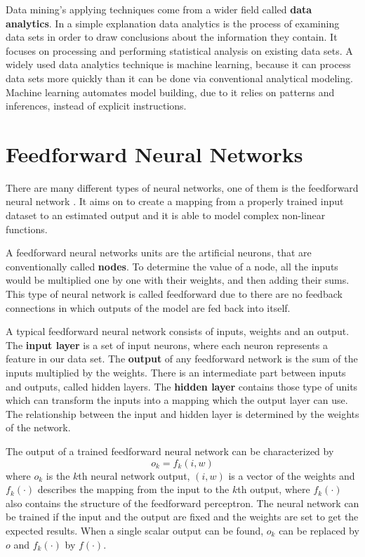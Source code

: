 Data mining's applying techniques come from a wider field called \textbf{data analytics}. In a simple explanation data analytics is the process of examining data sets in order to draw conclusions about the information they contain. It focuses on processing and performing statistical analysis on existing data sets. A widely used data analytics technique is machine learning, because it can process data sets more quickly than it can be done via conventional analytical modeling. Machine learning automates model building, due to it relies on patterns and inferences, instead of explicit instructions.



\section{Feedforward Neural Networks}

There are many different types of neural networks, one of them is the feedforward neural network \cite{fine2006feedforward}. It aims on to create a mapping from a properly trained input dataset to an estimated output and it is able to model complex non-linear functions. \medskip

A feedforward neural networks units are the artificial neurons, that are conventionally called \textbf{nodes}. To determine the value of a node, all the inputs would be multiplied one by one with their weights, and then adding their sums. This type of neural network is called feedforward due to there are no feedback connections in which outputs of the model are fed back into itself. \medskip

A typical feedforward neural network consists of inputs, weights and an output. The \textbf{input layer} is a set of input neurons, where each neuron represents a feature in our data set. The \textbf{output} of any feedforward network is the sum of the inputs multiplied by the weights. There is an intermediate part between inputs and outputs, called hidden layers. The \textbf{hidden layer} contains those type of units which can transform the inputs into a mapping which the output layer can use. The relationship between the input and hidden layer is determined by the weights of the network. \medskip

\noindent The output of a trained feedforward neural network can be characterized by
$$ o_k = f_k(i,w) $$
where $o_k$ is the $k$th neural network output, $(i,w)$ is a vector of the weights and $f_k(\cdot)$ describes the mapping from the input to the $k$th output, where $f_k(\cdot)$ also contains the structure of the feedforward perceptron. The neural network can be trained if the input and the output are fixed and the weights are set to get the expected results. When a single scalar output can be found, $o_k$ can be replaced by $o$ and $f_k(\cdot)$ by $f(\cdot)$.



